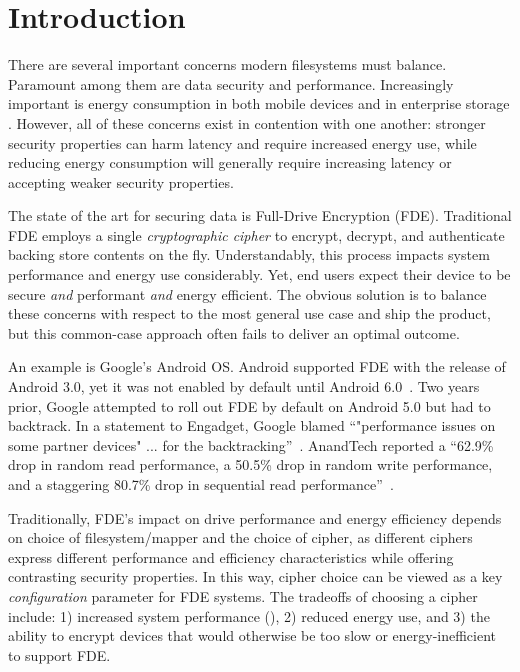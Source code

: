 \section{Introduction}\label{sec:introduction}

There are several important concerns modern filesystems must balance. Paramount
among them are data security and performance. Increasingly important is energy
consumption in both mobile devices and in enterprise storage
\cite{android-M-mobile-motivation, enterprise-motivation}. However, all of these
concerns exist in contention with one another: stronger security properties can
harm latency and require increased energy use, while reducing energy consumption
will generally require increasing latency or accepting weaker security
properties.

The state of the art for securing data is Full-Drive Encryption (FDE).
Traditional FDE employs a single \emph{cryptographic cipher} to encrypt,
decrypt, and authenticate backing store contents on the fly. Understandably,
this process impacts system performance and energy use considerably. Yet, end
users expect their device to be secure \emph{and} performant \emph{and} energy
efficient. The obvious solution is to balance these concerns with respect to the
most general use case and ship the product, but this common-case approach often
fails to deliver an optimal outcome.

An example is Google's Android OS. Android supported FDE with the release of
Android 3.0, yet it was not enabled by default until Android
6.0~\cite{android-M-mobile-motivation}. Two years prior, Google attempted to
roll out FDE by default on Android 5.0 but had to backtrack. In a statement to
Engadget, Google blamed ``"performance issues on some partner devices" ... for
the backtracking''~\cite{google-engadget}. AnandTech reported a ``62.9\% drop in
random read performance, a 50.5\% drop in random write performance, and a
staggering 80.7\% drop in sequential read
performance''~\cite{android-M-mobile-motivation-2}.

Traditionally, FDE's impact on drive performance and energy efficiency depends
on choice of filesystem/mapper and the choice of cipher, as different ciphers
express different performance and efficiency characteristics while offering
contrasting security properties. In this way, cipher choice can be viewed as a
key \emph{configuration} parameter for FDE systems. The tradeoffs of choosing a
cipher include: 1) increased system performance (), 2) reduced energy use, and 3) the ability to encrypt devices that
would otherwise be too slow or energy-inefficient to support FDE.


